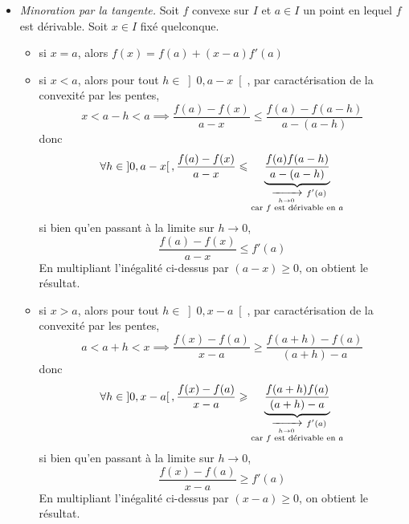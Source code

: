 \documentclass{article}
\renewenvironment{question_kholle}[2][ ]
{
	\subsection{\texorpdfstring{#2}{}}
	\notblank{#1}
	{
		\noindent #1
		\bigbreak
	}
	{}
	\begin{proof}
}
{
	\end{proof}
}
\begin{document}
\begin{question_kholle}
\begin{itemize}[label=$\vartriangleright$]
		\item \textit{Minoration par la tangente.} Soit $f$ convexe sur $I$ et $a\in I$ un point en lequel $f$ est dérivable. Soit $x\in I$ fixé quelconque.
		      \begin{itemize}
			      \item si $x=a$, alors $f(x)=f(a)+(x-a)f'(a)$
			      \item si $x<a$, alors pour tout $h\in\left]0, a-x\right[$, par caractérisation de la convexité par les pentes,
					            \[
						            x<a-h<a \implies  \frac{f(a)-f(x)}{a-x}\leq \frac{f(a)-f(a-h)}{a-(a-h)}
					            \]
					            donc
					            \[
					            \forall h\in\left]0, a-x\right[, \frac{f(a)-f(x)}{a-x}\leqslant \underbrace{\frac{f(a)f(a-h)}{a-(a-h)}}_{\substack{\ \xrightarrow[\;h \to 0\;]{}\  f'(a)\\ \text{car $f$ est dérivable en $a$}}}
				            \]
				            si bien qu’en passant à la limite sur $h\to 0$,
				            \[
					            \frac{f(a)-f(x)}{a-x}\leq f'(a)
				            \]
				            En multipliant l’inégalité ci-dessus par $(a-x)\geq 0$, on obtient le résultat.
			      \item si $x>a$, alors pour tout $h\in\left]0, x-a\right[$, par caractérisation de la convexité par les pentes,
					            \[
						            a<a+h<x \implies  \frac{f(x)-f(a)}{x-a}\geq \frac{f(a+h)-f(a)}{(a+h)-a}
					            \]
					            donc
					            \[
					            \forall h\in\left]0, x-a\right[, \frac{f(x)-f(a)}{x-a}\geqslant \underbrace{\frac{f(a+h)f(a)}{(a+h)-a}}_{\substack{\ \xrightarrow[\;h \to 0\;]{}\  f'(a)\\ \text{car $f$ est dérivable en $a$}}}
				            \]
				            si bien qu’en passant à la limite sur $h\to 0$,
				            \[
					            \frac{f(x)-f(a)}{x-a}\geq f'(a)
				            \]
				            En multipliant l’inégalité ci-dessus par $(x-a)\geq 0$, on obtient le résultat.

		      \end{itemize}
	\end{itemize}

\end{question_kholle}
\end{document}

